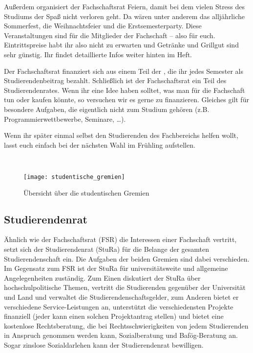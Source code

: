 Außerdem organisiert der Fachschaftsrat Feiern, damit bei dem vielen Stress des Studiums der Spaß nicht verloren geht.
Da wären unter anderem das alljährliche Sommerfest, die Weihnachtsfeier und die Erstsemesterparty.
Diese Veranstaltungen sind für die Mitglieder der Fachschaft -- also für euch.
Eintrittspreise habt ihr also nicht zu erwarten und Getränke und Grillgut sind sehr günstig.
Ihr findet detaillierte Infos weiter hinten im Heft.

Der Fachschaftsrat finanziert sich aus einem Teil der , die ihr jedes Semester als Studierendenbeitrag bezahlt.
Schließlich ist der Fachschaftsrat ein Teil des Studierendenrates.
Wenn ihr eine Idee haben solltet, was man für die Fachschaft tun oder kaufen könnte, so versuchen wir es gerne zu finanzieren.
Gleiches gilt für besondere Aufgaben, die eigentlich nicht zum Studium gehören (\;z.B. Programmierwettbewerbe, Seminare, \ldots).

Wenn ihr später einmal selbst den Studierenden des Fachbereichs helfen wollt, lasst euch einfach bei der nächsten Wahl im Frühling aufstellen.

\\

\begin{figure}[htb]
    \centering
    \texttt{[image: studentische\_gremien]}\\
    \caption{Übersicht über die studentischen Gremien}
    \label{fig:gremien}
\end{figure}

\subsection{Studierendenrat}

Ähnlich wie der Fachschaftsrat (FSR) die Interessen einer Fachschaft vertritt, setzt sich der Studierendenrat (StuRa) für die Belange der gesamten Studierendenschaft ein.
Die Aufgaben der beiden Gremien sind dabei verschieden.
Im Gegensatz zum FSR ist der StuRa für universitätsweite und allgemeine Angelegenheiten zuständig.
Zum Einen diskutiert der StuRa über hochschulpolitische Themen,  vertritt die Studierenden gegenüber der Universität und Land und verwaltet die Studierendenschaftsgelder, zum Anderen bietet er verschiedene Service-Leistungen an, unterstützt die verschiedensten Projekte finanziell (jeder kann einen solchen Projektantrag stellen) und bietet eine kostenlose Rechtsberatung, die bei Rechtsschwierigkeiten von jedem Studierenden in Anspruch genommen werden kann, Sozialberatung und Bafög-Beratung an.
Sogar zinslose Sozialdarlehen kann der Studierendenrat bewilligen.

